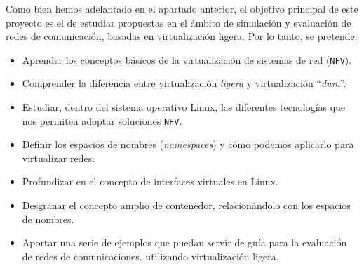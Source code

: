 \documentclass[a4paper, oneside, 12pt]{book}
\begin{document}
	\noindent Como bien hemos adelantado en el apartado anterior, el objetivo principal de este proyecto es el de estudiar propuestas en el ámbito de simulación y evaluación de redes de comunicación, basadas en virtualización ligera. Por lo tanto, se pretende: 
	\begin{itemize}
		\item Aprender los conceptos básicos de la virtualización de sistemas de red (\texttt{NFV}).
		\item Comprender la diferencia entre virtualización \textit{ligera} y virtualización ``\textit{dura}''.
		\item Estudiar, dentro del sistema operativo Linux, las diferentes tecnologías que nos permiten adoptar soluciones \texttt{NFV}.
		\item Definir los espacios de nombres (\textit{namespaces}) y cómo podemos aplicarlo para virtualizar redes.
		\item Profundizar en el concepto de interfaces virtuales en Linux.
		\item Desgranar el concepto amplio de contenedor, relacionándolo con los espacios de nombres.
		\item Aportar una serie de ejemplos que puedan servir de guía para la evaluación de redes de comunicaciones, utilizando virtualización ligera.
	\end{itemize}
\end{document}
